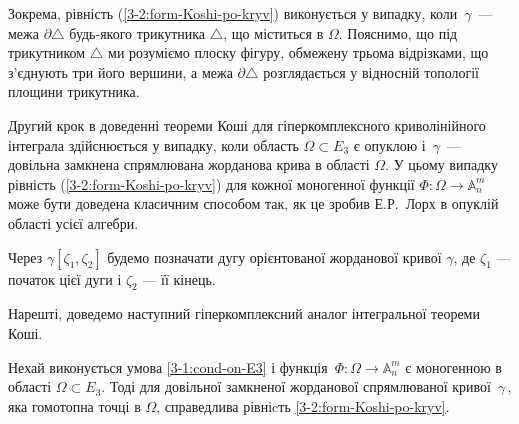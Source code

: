 \documentclass[11pt, reqno]{amsart}
\begin{document}
\begin{remark}\label{3-2:rem-th-C-M}
Зокрема, рівність (\ref{3-2:form-Koshi-po-kryv}) виконується у випадку, коли\, $\gamma$\, --- межа
$\partial\triangle$ будь-якого трикутника $\triangle$, що міститься в $\Omega$.
Пояснимо, що під трикутником $\triangle$ ми розуміємо плоску фігуру, обмежену
трьома відрізками, що з'єднують три його вершини, а
межа $\partial\triangle$ розглядається у відносній топології площини трикутника.
\end{remark}

Другий крок в доведенні теореми Коші для гіпер\-комп\-лекс\-но\-го криволінійного інтеграла здійснюється
у випадку, коли область $\Omega\subset E_3$ є опуклою і\, $\gamma$\, --- довільна замкнена спрямлювана жорданова
крива в області $\Omega$. У цьому випадку рівність (\ref{3-2:form-Koshi-po-kryv}) для кожної моногенної функції
$\Phi : \Omega\rightarrow\mathbb{A}_n^m$ може бути доведена класичним способом так, як це зробив Е.Р.~Лорх
\cite{Lorch} в опуклій області усієї алгебри.



Через $\gamma[\zeta_1,\zeta_2]$ будемо позначати дугу орієнтованої жорданової кривої $\gamma$,
де $\zeta_{1}$ --- початок цієї дуги і $\zeta_{2}$ --- її кінець.


Нарешті, доведемо наступний гіперкомплексний аналог інтегральної теореми Коші.


\begin{theorem}\label{3-2:teo-int-po-kryv-Blum}
Нехай виконується умова \eqref{3-1:cond-on-E3} і функція\, $\Phi:\Omega\rightarrow\mathbb{A}_n^m$ є моногенною
в області $\Omega\subset E_3$. Тоді для довільної замкненої жорданової спрямлюваної кривої\, $\gamma$\,,
яка гомотопна точці в $\Omega$, справедлива рівніcть \eqref{3-2:form-Koshi-po-kryv}.
\end{theorem}
\end{document}
